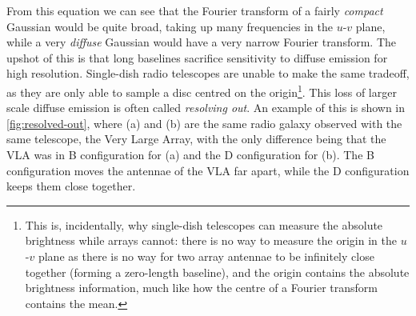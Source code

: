\documentclass[11pt, a4paper]{book}
\newcommand{\defn}[1]{\emph{#1}}
\providecommand{\DIFaddtex}[1]{{\protect\color{blue}\uwave{#1}}} %
\providecommand{\DIFaddbegin}{} %
\providecommand{\DIFaddend}{} %
\providecommand{\DIFadd}[1]{\texorpdfstring{\DIFaddtex{#1}}{#1}} %
\newcommand{\DIFaddincludegraphics}[2][]{{\color{blue}\fbox{\DIFOincludegraphics[#1]{#2}}}} %
\DeclareRobustCommand{\DIFaddbegin}{\DIFOaddbegin \let\includegraphics\DIFaddincludegraphics} %
\DeclareRobustCommand{\DIFaddend}{\DIFOaddend \let\includegraphics\DIFOincludegraphics} %
\begin{document}
        From this equation we can see that the Fourier transform of a fairly \emph{compact} Gaussian \DIFaddbegin \DIFadd{(small $\sigma$) }\DIFaddend would be quite broad, taking up many frequencies in the $u$-$v$ plane, while a very \emph{diffuse} Gaussian \DIFaddbegin \DIFadd{(large $\sigma$) }\DIFaddend would have a very narrow Fourier transform. The upshot of this is that long baselines sacrifice sensitivity to diffuse emission for high resolution. Single-dish radio telescopes are unable to make the same tradeoff, as they are only able to sample a disc centred on the origin\footnote{This is, incidentally, why single-dish telescopes can measure the absolute brightness while arrays cannot: there is no way to measure the origin in the $u$-$v$ plane as there is no way for two array antennae to be infinitely close together (forming a zero-length baseline), and the origin contains the absolute brightness information, much like how the centre of a Fourier transform contains the mean.}. This loss of larger scale diffuse emission is often called \defn{resolving out}. An example of this is shown in \autoref{fig:resolved-out}, where (a) and (b) are the same radio galaxy observed with the same telescope, the Very Large Array, with the only difference being that the VLA was in B configuration for (a) and the D configuration for (b). The B configuration moves the antennae of the VLA far apart, while the D configuration keeps them close together.
\end{document}
